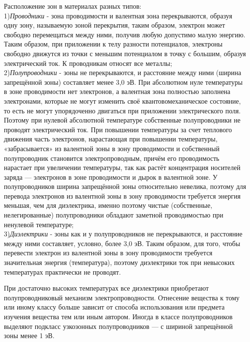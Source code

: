 	Расположение зон в материалах разных типов:
	\\
	1)\textit{Проводники} - зона проводимости и валентная зона перекрываются, образуя одну зону, называемую зоной перекрытия, таким образом, электрон может свободно перемещаться между ними, получив любую допустимо малую энергию. Таким образом, при приложении к телу разности потенциалов, электроны свободно движутся из точки с меньшим потенциалом в точку с большим, образуя электрический ток. К проводникам относят все металлы;
	\\
	2)\textit{Полупроводники} - зоны не перекрываются, и расстояние между ними (ширина запрещённой зоны) составляет менее 3,0 эВ. При абсолютном нуле температуры в зоне проводимости нет электронов, а валентная зона полностью заполнена электронами, которые не могут изменить своё квантовомеханическое состояние, то есть не могут упорядоченно двигаться при приложении электрического поля. Поэтому при нулевой абсолютной температуре собственные полупроводники не проводят электрический ток. При повышении температуры за счет теплового движения часть электронов, нарастающая при повышении температуры, «забрасывается» из валентной зоны в зону проводимости и собственный полупроводник становится электропроводным, причём его проводимость нарастает при увеличении температуры, так как растёт концентрация носителей заряда — электронов в зоне проводимости и дырок в валентной зоне. У полупроводников ширина запрещённой зоны относительно невелика, поэтому для перевода электронов из валентной зоны в зону проводимости требуется энергия меньшая, чем для диэлектрика, именно поэтому чистые (собственные, нелегированные) полупроводники обладают заметной проводимостью при ненулевой температуре; 
	\\
	3)\textit{Диэлектрики} - зоны как и у полупроводников не перекрываются, и расстояние между ними составляет, условно, более 3,0 эВ. Таким образом, для того, чтобы перевести электрон из валентной зоны в зону проводимости требуется значительная энергия (температура), поэтому диэлектрики ток при невысоких температурах практически не проводят.
	
	\par При достаточно высоких температурах все диэлектрики приобретают полупроводниковый механизм электропроводности. Отнесение вещества к тому или иному классу больше зависит от способа использования или предмета изучения вещества тем или иным автором. Иногда в классе полупроводников выделяют подкласс узкозонных полупроводников — с шириной запрещённой зоны менее 1 эВ.
	
